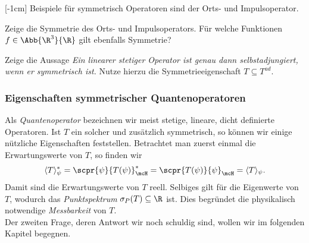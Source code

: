 \documentclass{subfiles}
\begin{document}
    [-1cm]
        Beispiele für symmetrisch Operatoren sind der Orts- und Impulsoperator.
        \begin{Aufgabe}
            \nr{} Zeige die Symmetrie des Orts- und Impulsoperators. Für welche Funktionen $f\in\Abb{\R^3}{\R}$ gilt ebenfalls Symmetrie?
            
            \nr{} Zeige die Aussage \textit{Ein linearer stetiger Operator ist genau dann selbstadjungiert, wenn er symmetrisch ist.} Nutze hierzu die Symmetrieeigenschaft $T\subseteq T^{\textit{ad}}$. 
        \end{Aufgabe}
    \subsubsection*{Eigenschaften symmetrischer Quantenoperatoren}
        Als \emph{Quantenoperator} bezeichnen wir meist stetige, lineare, dicht definierte Operatoren. Ist $T$ ein solcher und zusätzlich symmetrisch, so können wir einige nützliche Eigenschaften feststellen. Betrachtet man zuerst einmal die Erwartungswerte von $T$, so finden wir 
        \[\langle T\rangle_\psi^* = \scpr{\psi}{T(\psi)}_\mcH^* = \scpr{T(\psi)}{\psi}_\mcH = \langle T\rangle_\psi.\]
        Damit sind die Erwartungswerte von $T$ reell. Selbiges gilt für die Eigenwerte von $T$, wodurch das \emph{Punktspektrum} $\sigma_P(T)\subseteq\R$ ist. Dies begründet die physikalisch notwendige \emph{Messbarkeit} von $T$. \\

        Der zweiten Frage, deren Antwort wir noch schuldig sind, wollen wir im folgenden Kapitel begegnen. 
\end{document}
